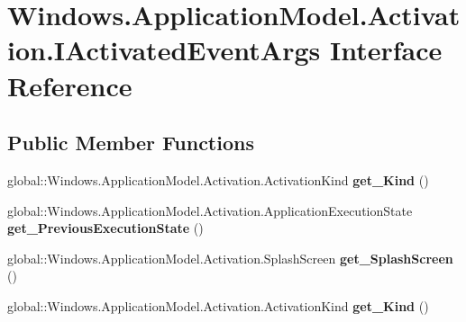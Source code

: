 \hypertarget{interface_windows_1_1_application_model_1_1_activation_1_1_i_activated_event_args}{}\section{Windows.\+Application\+Model.\+Activation.\+I\+Activated\+Event\+Args Interface Reference}
\label{interface_windows_1_1_application_model_1_1_activation_1_1_i_activated_event_args}
\subsection*{Public Member Functions}
\begin{DoxyCompactItemize}
\item 
\mbox{\label{interface_windows_1_1_application_model_1_1_activation_1_1_i_activated_event_args_ae3df998eda324e7f240cbb1506811f7f}} 
global\+::\+Windows.\+Application\+Model.\+Activation.\+Activation\+Kind {\bfseries get\+\_\+\+Kind} ()
\item 
\mbox{\label{interface_windows_1_1_application_model_1_1_activation_1_1_i_activated_event_args_aa734f32f7c7386e843c56f98215083bf}} 
global\+::\+Windows.\+Application\+Model.\+Activation.\+Application\+Execution\+State {\bfseries get\+\_\+\+Previous\+Execution\+State} ()
\item 
\mbox{\label{interface_windows_1_1_application_model_1_1_activation_1_1_i_activated_event_args_a782c2a15d296b0422175e334ea04039c}} 
global\+::\+Windows.\+Application\+Model.\+Activation.\+Splash\+Screen {\bfseries get\+\_\+\+Splash\+Screen} ()
\item 
\mbox{\label{interface_windows_1_1_application_model_1_1_activation_1_1_i_activated_event_args_ae3df998eda324e7f240cbb1506811f7f}} 
global\+::\+Windows.\+Application\+Model.\+Activation.\+Activation\+Kind {\bfseries get\+\_\+\+Kind} ()
\item 
\mbox{\label{interface_windows_1_1_application_model_1_1_activation_1_1_i_activated_event_args_aa734f32f7c7386e843c56f98215083bf}} 

\end{DoxyCompactItemize}
